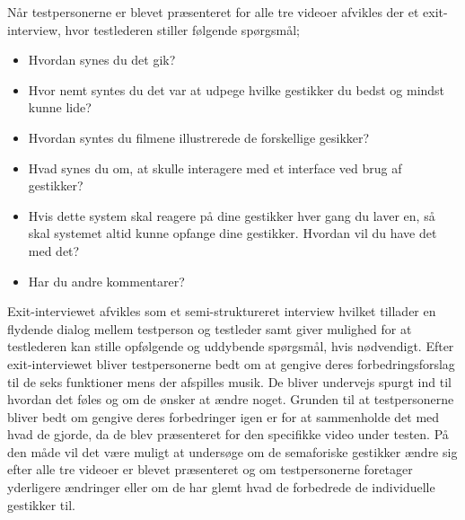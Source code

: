 Når testpersonerne er blevet præsenteret for alle tre videoer afvikles der et exit-interview, hvor testlederen stiller følgende spørgsmål; \blankline
%
\begin{itemize}
  \item Hvordan synes du det gik? 
  \item Hvor nemt syntes du det var at udpege hvilke gestikker du bedst og mindst kunne lide? 
  \item Hvordan syntes du filmene illustrerede de forskellige gesikker? 
  \item Hvad synes du om, at skulle interagere med et interface ved brug af gestikker? 
  \item Hvis dette system skal reagere på dine gestikker hver gang du laver en, så skal systemet altid kunne opfange dine gestikker. Hvordan vil du have det med det? 
  \item Har du andre kommentarer?\blankline
\end{itemize}
\noindent
%
Exit-interviewet afvikles som et semi-struktureret interview hvilket tillader en flydende dialog mellem testperson og testleder samt giver mulighed for at testlederen kan stille opfølgende og uddybende spørgsmål, hvis nødvendigt. Efter exit-interviewet bliver testpersonerne bedt om at gengive deres forbedringsforslag til de seks funktioner mens der afspilles musik. De bliver undervejs spurgt ind til hvordan det føles og om de ønsker at ændre noget. Grunden til at testpersonerne bliver bedt om gengive deres forbedringer igen er for at sammenholde det med hvad de gjorde, da de blev præsenteret for den specifikke video under testen. På den måde vil det være muligt at undersøge om de semaforiske gestikker ændre sig efter alle tre videoer er blevet præsenteret og om testpersonerne foretager yderligere ændringer eller om de har glemt hvad de forbedrede de individuelle gestikker til.    
%

